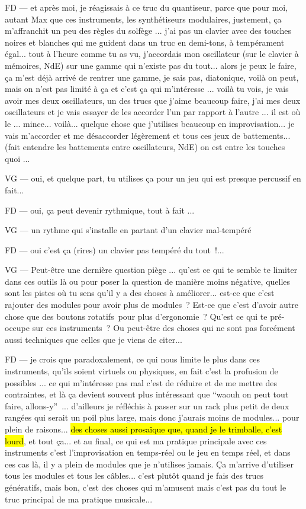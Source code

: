 FD — et après moi, je réagissais à ce truc du quantiseur, parce que pour moi, autant Max que ces instruments, les synthétiseurs modulaires, justement, ça m'affranchit un peu des règles du solfège ... j'ai pas un clavier avec des touches noires et blanches qui me guident dans un truc en demi-tons, à tempérament égal... tout à l'heure comme tu as vu, j'accordais mon oscillateur (sur le clavier à mémoires, NdE) sur une gamme qui n'existe pas du tout... alors je peux le faire, ça m'est déjà arrivé de rentrer une gamme, je sais pas, diatonique, voilà on peut, mais on n'est pas limité à ça et c'est ça qui m'intéresse ... voilà tu vois, je vais avoir mes deux oscillateurs, un des trucs que j'aime beaucoup faire, j'ai mes deux oscillateurs et je vais essayer de les accorder l'un par rapport à l'autre ... il est où le ... mince... voilà... quelque chose que j'utilises beaucoup en improvisation... je vais m'accorder et me désaccorder légèrement et tous ces jeux de battements... (fait entendre les battements entre oscillateurs, NdE) on est entre les touches quoi ... 

VG — oui, et quelque part, tu utilises ça pour un jeu qui est presque percussif en fait... 

FD — oui, ça peut devenir rythmique, tout à fait ... 

VG — un rythme qui s'installe en partant d'un clavier mal-tempéré 

FD — oui c'est ça (rires) un clavier pas tempéré du tout !... 

VG — Peut-être une dernière question piège ... qu'est ce qui te semble te limiter dans ces outils là ou pour poser la question de manière moins négative, quelles sont les pistes où tu sens qu'il y a des choses à améliorer... est-ce que c'est rajouter des modules pour avoir plus de modules ? Est-ce que c'est d'avoir autre chose que des boutons rotatifs pour plus d'ergonomie ? Qu'est ce qui te pré-occupe sur ces instruments ? Ou peut-être des choses qui ne sont pas forcément aussi techniques que celles que je viens de citer... 

FD — je crois que paradoxalement, ce qui nous limite le plus dans ces instruments, qu'ils soient virtuels ou physiques, en fait c'est la profusion de possibles ... ce qui m'intéresse pas mal c'est de réduire et de me mettre des contraintes, et là ça devient souvent plus intéressant que ``waouh on peut tout faire, allons-y'' ... d'ailleurs je réfléchis à passer sur un rack plus petit de deux rangées qui serait un poil plus large, mais donc j'aurais moins de modules... pour plein de raisons... \hl{des choses aussi prosaïque que, quand je le trimballe, c'est lourd}, et tout ça... et au final, ce qui est ma pratique principale avec ces instruments c'est l'improvisation en temps-réel ou le jeu en temps réel, et dans ces cas là, il y a plein de modules que je n'utilises jamais. Ça m'arrive d'utiliser tous les modules et tous les câbles... c'est plutôt quand je fais des trucs génératifs, mais bon, c'est des choses qui m'amusent mais c'est pas du tout le truc principal de ma pratique musicale... 

